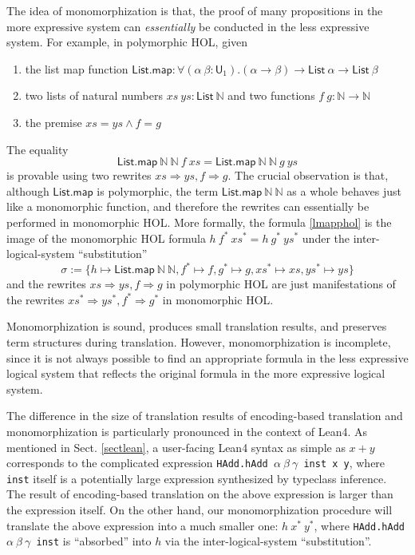   The idea of monomorphization is that, the proof of many propositions in the more expressive
  system can \textit{essentially} be conducted in the less expressive system. For example,
  in polymorphic HOL, given
  \begin{enumerate}
    \item the list map function $\mathsf{List.map} : \forall (\alpha \ \beta : \mathsf{U}_1). (\alpha \to \beta) \to \mathsf{List} \ \alpha \to \mathsf{List} \ \beta$
    \item two lists of natural numbers $xs \ ys : \mathsf{List} \ \mathbb{N}$ and two functions $f \ g : \mathbb{N} \to \mathbb{N}$
    \item the premise $xs = ys \land f = g$
  \end{enumerate}
  The equality
  \begin{equation}\label{lmapphol}
    \mathsf{List.map} \ \mathbb{N} \ \mathbb{N} \ f \ xs = \mathsf{List.map} \ \mathbb{N} \ \mathbb{N} \ g \ ys
  \end{equation}
  is provable using two rewrites $xs \Rightarrow ys, f \Rightarrow g$. The crucial observation is that, although $\textsf{List.map}$ is polymorphic, the term
  $\mathsf{List.map} \ \mathbb{N} \ \mathbb{N}$ as a whole behaves just like a monomorphic function,
  and therefore the rewrites can essentially be performed in monomorphic HOL. More formally,
  the formula \eqref{lmapphol} is the image of the monomorphic HOL formula $h \ f^* \ xs^* = h \ g^* \ ys^*$
  under the inter-logical-system ``substitution''
  $$\sigma := \{h \mapsto \mathsf{List.map} \ \mathbb{N} \ \mathbb{N},
    f^* \mapsto f, g^* \mapsto g, xs^* \mapsto xs, ys^* \mapsto ys\}$$
  and the rewrites $xs \Rightarrow ys, f \Rightarrow g$ in polymorphic HOL are just manifestations of the
  rewrites $xs^* \Rightarrow ys^*, f^* \Rightarrow g^*$ in monomorphic HOL.
  
  Monomorphization is sound, produces small translation results, and preserves
  term structures during translation. However, monomorphization is incomplete,
  since it is not always possible to find an appropriate formula in the less
  expressive logical system that reflects the original formula in the more expressive logical system.


  The difference in the size of translation results of encoding-based translation
  and monomorphization is particularly pronounced in the context of Lean4. As mentioned in Sect. \ref{sectlean},
  a user-facing Lean4 syntax as simple as $x + y$ corresponds to
  the complicated expression \texttt{HAdd.hAdd $\alpha \ \beta \ \gamma$ inst x y}, where \texttt{inst}
  itself is a potentially large expression synthesized by typeclass inference. The result
  of encoding-based translation on the above expression is larger than the expression itself.
  On the other hand, our monomorphization procedure will translate the above expression
  into a much smaller one: $h \ x^* \ y^*$, where \texttt{HAdd.hAdd $\alpha \ \beta \ \gamma$ inst}
  is ``absorbed'' into $h$ via the inter-logical-system ``substitution''.